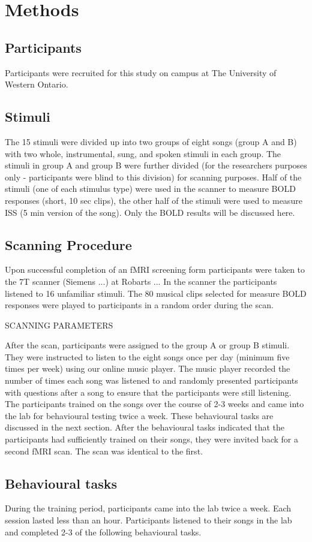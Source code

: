 \documentclass[12pt,letterpaper]{report}
\begin{document}
\section{Methods}
\subsection{Participants}
Participants were recruited for this study on campus at The University of Western Ontario. 
\subsection{Stimuli}
The 15 stimuli were divided up into two groups of eight songs (group A and B) with two whole, instrumental, sung, and spoken stimuli in each group.
The stimuli in group A and group B were further divided (for the researchers purposes only - participants were blind to this division) for scanning purposes. 
Half of the stimuli (one of each stimulus type) were used in the scanner to measure BOLD responses (short, 10 sec clips), the other half of the stimuli were used to measure ISS (5 min version of the song). Only the BOLD results will be discussed here. 
\subsection{Scanning Procedure}
Upon successful completion of an fMRI screening form participants were taken to the 7T scanner (Siemens ...) at Robarts ... 
In the scanner the participants listened to 16 unfamiliar stimuli. 
The 80 musical clips selected for measure BOLD responses were played to participants in a random order during the scan. 

SCANNING PARAMETERS

After the scan, participants were assigned to the group A or group B stimuli. They were instructed to listen to the eight songs once per day (minimum five times per week) using our online music player. 
The music player recorded the number of times each song was listened to and randomly presented participants with questions after a song to ensure that the participants were still listening. 
The participants trained on the songs over the course of 2-3 weeks and came into the lab for behavioural testing twice a week. These behavioural tasks are discussed in the next section. 
After the behavioural tasks indicated that the participants had sufficiently trained on their songs, they were invited back for a second fMRI scan. 
The scan was identical to the first.
\subsection{Behavioural tasks}
During the training period, participants came into the lab twice a week.
Each session lasted less than an hour.
Participants listened to their songs in the lab and completed 2-3 of the following behavioural tasks. 
\end{document}
